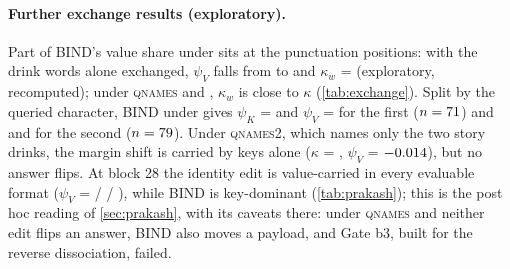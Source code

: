 \paragraph{Further exchange results (exploratory).} Part of BIND's value share under \fmtNone{} sits at the punctuation positions: with the drink words alone exchanged, $\psi_V$ falls from \PkPsiVBindNone{} to \PkPsiVwBindNone{} and $\kappa_w$ = \PkKappaWBindNone{} (exploratory, recomputed); under \textsc{qnames} and \fmtOpt{}, $\kappa_w$ is close to $\kappa$ (\cref{tab:exchange}). Split by the queried character, BIND under \fmtNone{} gives $\psi_K$ = \PkPsiKqZeroBindNone{} and $\psi_V$ = \PkPsiVqZeroBindNone{} for the first ($n = 71{}$) and \PkPsiKqOneBindNone{} and \PkPsiVqOneBindNone{} for the second ($n = 79{}$). Under \textsc{qnames2}, which names only the two story drinks, the margin shift is carried by keys alone ($\kappa$ = \PkKappaBindQnamestwo{}, $\psi_V$ = $-0.014$), but no answer flips. At block 28 the identity edit is value-carried in every evaluable format ($\psi_V$ = \PkPsiVIdTwentyeightNone{} / \PkPsiVIdTwentyeightQnames{} / \PkPsiVIdTwentyeightOpt{}), while BIND is key-dominant (\cref{tab:prakash}); this is the post hoc reading of \cref{sec:prakash}, with its caveats there: under \textsc{qnames} and \fmtOpt{} neither edit flips an answer, BIND also moves a payload, and Gate b3, built for the reverse dissociation, failed.

\begin{table}[!ht]
\centering
\caption{\textbf{Identity key share of the natural clamp on the stories of \citet{prakash2025lookbacks}} (Qwen2.5-14B-Instruct, \PkN{} pairs). $s_{\mathrm{ID}} = \overline{\mathrm{ID}}_K/(\overline{\mathrm{ID}}_K + \overline{\mathrm{ID}}_V)$ for keys and values clamped at the queried drink word from block $\ell_0$ on. The onsets 0, 1, 3, 14 and 29 are preregistered in the four formats; the others form an exploratory sweep in \fmtNone{} and \fmtOpt{}. Under \fmtLetter{} at $\ell_0 = 29$ the denominator is near zero, so $s_{\mathrm{ID}}$ is undetermined (CI in \cref{tab:prakash}).}
\label{tab:clamp}
\resizebox{\textwidth}{!}{}
\end{table}

